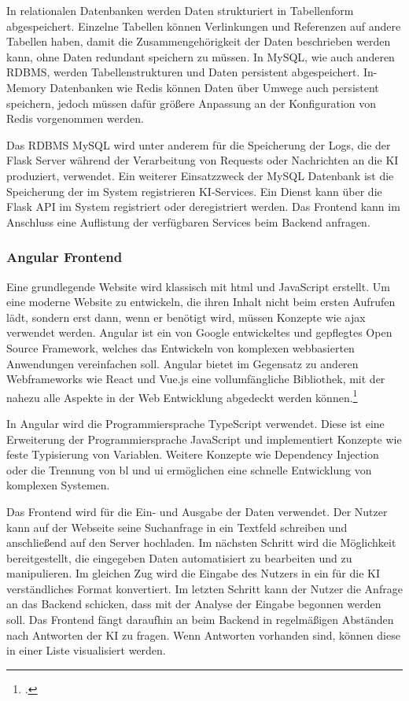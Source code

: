 In relationalen Datenbanken werden Daten strukturiert in Tabellenform abgespeichert. Einzelne Tabellen können Verlinkungen und Referenzen auf andere Tabellen haben, damit die Zusammengehörigkeit der Daten beschrieben werden kann, ohne Daten redundant speichern zu müssen. In MySQL, wie auch anderen RDBMS, werden Tabellenstrukturen und Daten persistent abgespeichert. In-Memory Datenbanken wie Redis können Daten über Umwege auch persistent speichern, jedoch müssen dafür größere Anpassung an der Konfiguration von Redis vorgenommen werden.

Das RDBMS MySQL wird unter anderem für die Speicherung der Logs, die der Flask Server während der Verarbeitung von Requests oder Nachrichten an die KI produziert, verwendet. Ein weiterer Einsatzzweck der MySQL Datenbank ist die Speicherung der im System registrieren KI-Services. Ein Dienst kann über die Flask API im System registriert oder deregistriert werden. Das Frontend kann im Anschluss eine Auflistung der verfügbaren Services beim Backend anfragen.

\subsubsection{Angular Frontend}
Eine grundlegende Website wird klassisch mit \ac{html} und JavaScript erstellt. Um eine moderne Website zu entwickeln, die ihren Inhalt nicht beim ersten Aufrufen lädt, sondern erst dann, wenn er benötigt wird, müssen Konzepte wie \ac{ajax} verwendet werden. Angular ist ein von Google entwickeltes und gepflegtes Open Source Framework, welches das Entwickeln von komplexen webbasierten Anwendungen vereinfachen soll. Angular bietet im Gegensatz zu anderen Webframeworks wie React und Vue.js eine vollumfängliche Bibliothek, mit der nahezu alle Aspekte in der Web Entwicklung abgedeckt werden können.\footcite{moiseev2018angular}

In Angular wird die Programmiersprache TypeScript verwendet. Diese ist eine Erweiterung der Programmiersprache JavaScript und implementiert Konzepte wie feste Typisierung von Variablen. Weitere Konzepte wie Dependency Injection oder die Trennung von \ac{bl} und \ac{ui} ermöglichen eine schnelle Entwicklung von komplexen Systemen. 

Das Frontend wird für die Ein- und Ausgabe der Daten verwendet. Der Nutzer kann auf der Webseite seine Suchanfrage in ein Textfeld schreiben und anschließend auf den Server hochladen. Im nächsten Schritt wird die Möglichkeit bereitgestellt, die eingegeben Daten automatisiert zu bearbeiten und zu manipulieren. Im gleichen Zug wird die Eingabe des Nutzers in ein für die KI verständliches Format konvertiert. Im letzten Schritt kann der Nutzer die Anfrage an das Backend schicken, dass mit der Analyse der Eingabe begonnen werden soll. Das Frontend fängt daraufhin an beim Backend in regelmäßigen Abständen nach Antworten der KI zu fragen. Wenn Antworten vorhanden sind, können diese in einer Liste visualisiert werden.


